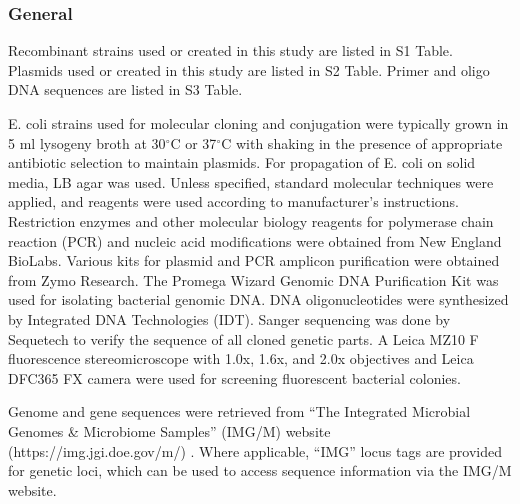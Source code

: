 \subsubsection{General}
Recombinant strains used or created in this study are listed in S1 Table. Plasmids used or created in this study are listed in S2 Table. Primer and oligo DNA sequences are listed in S3 Table. 

E. coli strains used for molecular cloning and conjugation were typically grown in 5 ml lysogeny broth at 30$^\circ$C or 37$^\circ$C with shaking in the presence of appropriate antibiotic selection to maintain plasmids. For propagation of E. coli on solid media, LB agar was used. Unless specified, standard molecular techniques were applied, and reagents were used according to manufacturer's instructions. Restriction enzymes and other molecular biology reagents for polymerase chain reaction (PCR) and nucleic acid modifications were obtained from New England BioLabs. Various kits for plasmid and PCR amplicon purification were obtained from Zymo Research. The Promega Wizard Genomic DNA Purification Kit was used for isolating bacterial genomic DNA. DNA oligonucleotides were synthesized by Integrated DNA Technologies (IDT). Sanger sequencing was done by Sequetech to verify the sequence of all cloned genetic parts. A Leica MZ10 F fluorescence stereomicroscope with 1.0x, 1.6x, and 2.0x objectives and Leica DFC365 FX camera were used for screening fluorescent bacterial colonies. 

Genome and gene sequences were retrieved from ``The Integrated Microbial Genomes \& Microbiome Samples'' (IMG/M) website (https://img.jgi.doe.gov/m/) \cite{chen_imgm_2017}. Where applicable, ``IMG'' locus tags are provided for genetic loci, which can be used to access sequence information via the IMG/M website. 

